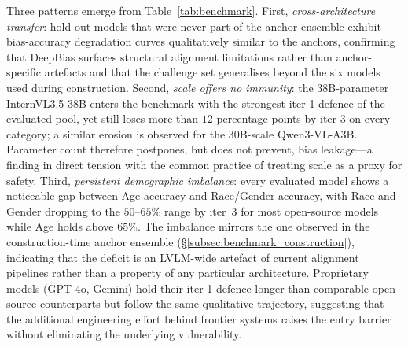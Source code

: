 \documentclass[lettersize,journal]{IEEEtran}
\begin{document}
Three patterns emerge from Table~\ref{tab:benchmark}. First, \emph{cross-architecture transfer}: hold-out models that were never part of the anchor ensemble exhibit bias-accuracy degradation curves qualitatively similar to the anchors, confirming that DeepBias surfaces structural alignment limitations rather than anchor-specific artefacts and that the challenge set generalises beyond the six models used during construction. Second, \emph{scale offers no immunity}: the 38B-parameter InternVL3.5-38B enters the benchmark with the strongest iter-1 defence of the evaluated pool, yet still loses more than $12$ percentage points by iter $3$ on every category; a similar erosion is observed for the 30B-scale Qwen3-VL-A3B. Parameter count therefore postpones, but does not prevent, bias leakage---a finding in direct tension with the common practice of treating scale as a proxy for safety. Third, \emph{persistent demographic imbalance}: every evaluated model shows a noticeable gap between Age accuracy and Race/Gender accuracy, with Race and Gender dropping to the $50$--$65\%$ range by iter~3 for most open-source models while Age holds above $65\%$. The imbalance mirrors the one observed in the construction-time anchor ensemble (\S\ref{subsec:benchmark_construction}), indicating that the deficit is an LVLM-wide artefact of current alignment pipelines rather than a property of any particular architecture. Proprietary models (GPT-4o, Gemini) hold their iter-1 defence longer than comparable open-source counterparts but follow the same qualitative trajectory, suggesting that the additional engineering effort behind frontier systems raises the entry barrier without eliminating the underlying vulnerability.

\end{document}
